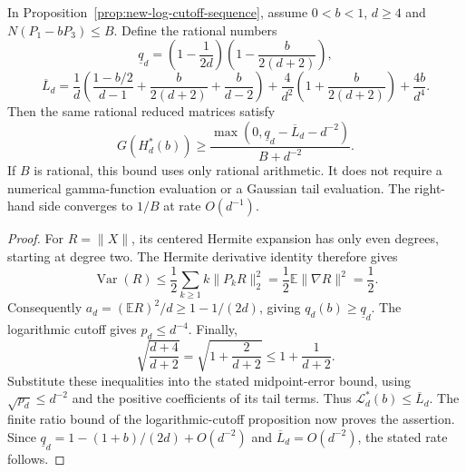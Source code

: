 \begin{corollary}
\label{cor:new-rational-log-cutoff-bound}
In Proposition~\ref{prop:new-log-cutoff-sequence}, assume
$0<b<1$, $d\geq4$ and $N(P_1-bP_3)\leq B$. Define the rational numbers
\[
 \underline q_d=
 \left(1-\frac1{2d}\right)
 \left(1-\frac b{2(d+2)}\right),
\]
\[
 \overline L_d=
 \frac1d\left(\frac{1-b/2}{d-1}
                   +\frac b{2(d+2)}+\frac b{d-2}\right)
 +\frac4{d^2}\left(1+\frac b{2(d+2)}\right)
 +\frac{4b}{d^4}.
\]
Then the same rational reduced matrices satisfy
\[
 G(H_d^*(b))\geq
 \frac{\max(0,\underline q_d-\overline L_d-d^{-2})}{B+d^{-2}}.
\]
If $B$ is rational, this bound uses only rational arithmetic. It does
not require a numerical gamma-function evaluation or a Gaussian tail
evaluation. The right-hand side converges to $1/B$ at rate $O(d^{-1})$.
\end{corollary}
\begin{proof}
For $R=\|X\|$, its centered Hermite expansion has only even degrees,
starting at degree two. The Hermite derivative identity therefore gives
\[
 \operatorname{Var}(R)\leq
 \frac12\sum_{k\geq1}k\|P_kR\|_2^2
 =\frac12\mathbb E\|\nabla R\|^2=\frac12.
\]
Consequently $a_d=(\mathbb ER)^2/d\geq1-1/(2d)$, giving
$q_d(b)\geq\underline q_d$. The logarithmic cutoff gives
$p_d\leq d^{-4}$. Finally,
\[
 \sqrt{\frac{d+4}{d+2}}
 =\sqrt{1+\frac2{d+2}}\leq1+\frac1{d+2}.
\]
Substitute these inequalities into the stated midpoint-error bound,
using $\sqrt{p_d}\leq d^{-2}$ and the positive coefficients of its
tail terms. Thus $\mathcal L_d^*(b)\leq\overline L_d$.
The finite ratio bound of the logarithmic-cutoff proposition now proves
the assertion. Since $\underline q_d=1-(1+b)/(2d)+O(d^{-2})$ and
$\overline L_d=O(d^{-2})$, the stated rate follows.
\end{proof}
